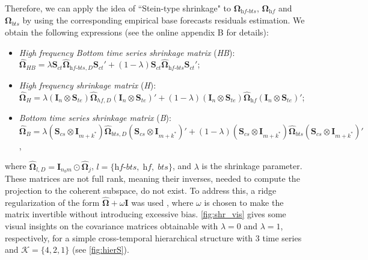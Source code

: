 \documentclass[a4paper,11pt]{article}
\newcommand{\Ivet}{\bm{I}}
\newcommand{\Svet}{\bm{S}}
\newcommand{\Omegavet}{\bm{\Omega}}
\theoremstyle{definition}
\begin{document}
Therefore, we can apply the idea of “Stein-type shrinkage" \citep{efron1977} to $\Omegavet_{\textit{hf-bts}}$, $\Omegavet_{\textit{hf}}$ and $\Omegavet_{\textit{bts}}$ by using the corresponding empirical base forecasts residuals estimation. We obtain the following expressions (see the online appendix B for details):
\begin{itemize}[nosep]
	\item \textit{High frequency Bottom time series shrinkage matrix} (\textit{HB}): \\
	$\widehat{\Omegavet}_{HB} = \lambda \Svet_{ct}\widehat{\Omegavet}_{\textit{hf-bts}, D}\Svet_{ct}'+ (1-\lambda) \Svet_{ct}\widehat{\Omegavet}_{\textit{hf-bts}}\Svet_{ct}'$;
	\item \textit{High frequency shrinkage matrix} (\textit{H}): \\ $\widehat{\Omegavet}_{H}  = \lambda (\Ivet_{n} \otimes \Svet_{te})\widehat{\Omegavet}_{hf, D}(\Ivet_{n} \otimes \Svet_{te})' + (1-\lambda) (\Ivet_{n} \otimes \Svet_{te})\widehat{\Omegavet}_{\textit{hf}}(\Ivet_{n} \otimes \Svet_{te})'$;
	\item \textit{Bottom time series shrinkage matrix} (\textit{B}): \\$\widehat{\Omegavet}_{B} = \lambda \left(\Svet_{cs} \otimes \Ivet_{m+k^\ast}\right)\widehat{\Omegavet}_{bts, D}\left(\Svet_{cs} \otimes \Ivet_{m+k^\ast}\right)' +  (1-\lambda) \left(\Svet_{cs} \otimes \Ivet_{m+k^\ast}\right)\widehat{\Omegavet}_{bts}\left(\Svet_{cs} \otimes \Ivet_{m+k^\ast}\right)'$,
\end{itemize}
where $\widehat{\Omegavet}_{l, D} = \Ivet_{n_b m}\odot\widehat{\Omegavet}_{j}$, $l = \{\textit{hf-bts}, \;\textit{hf}, \;\textit{bts}\}$, and $\lambda$ is the shrinkage parameter.
These matrices are not full rank, meaning their inverses, needed to compute the projection to the coherent subspace, do not exist. To address this, a ridge regularization of the form $\widehat{\Omegavet} + \omega \Ivet$ was used \citep{marquardt1970t}, where $\omega$ is chosen to make the matrix invertible without introducing excessive bias. \autoref{fig:shr_vis} gives some visual insights on the covariance matrices obtainable with $\lambda = 0$ and $\lambda = 1$, respectively, for a simple cross-temporal hierarchical structure with 3 time series and $\mathcal{K} = \{4,2,1\}$ (see \autoref{fig:hierS}).
\end{document}
